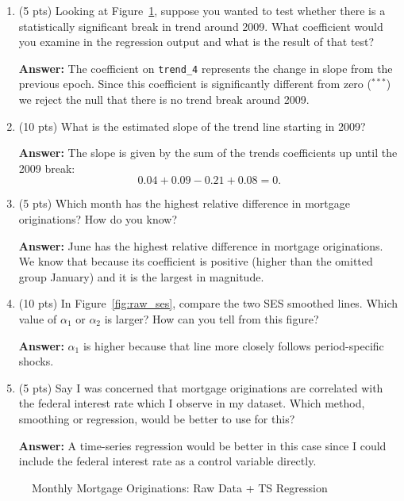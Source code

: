 \documentclass[12pt]{article}
\newcommand{\answer}[1]{{\color{blue_winged_teal}\textbf{Answer:} #1}}
\newcommand{\pts}[1]{{\color{zinc500}(#1 pts)}}
\begin{document}
\begin{enumerate}
    \begin{enumerate}
      \item \pts{5} Looking at Figure~\ref{fig:raw_ts}, suppose you wanted to test whether there is a statistically significant break in trend around 2009.
        What coefficient would you examine in the regression output and what is the result of that test? 

      \answer{
        The coefficient on \texttt{trend\_4} represents the change in slope from the previous epoch. 
        Since this coefficient is significantly different from zero ($^{***}$) we reject the null that there is no trend break around 2009. 
      }
        
      \item \pts{10} What is the estimated slope of the trend line starting in 2009?

      \answer{
        The slope is given by the sum of the trends coefficients up until the 2009 break:
        $$
          0.04 + 0.09 - 0.21 + 0.08 = 0.
        $$
      }

      \item \pts{5} Which month has the highest relative difference in mortgage originations? How do you know?

      \answer{June has the highest relative difference in mortgage originations. We know that because its coefficient is positive (higher than the omitted group January) and it is the largest in magnitude.}

      \item \pts{10} In Figure~\ref{fig:raw_ses}, compare the two SES smoothed lines. Which value of $\alpha_1$ or $\alpha_2$ is larger?
        How can you tell from this figure?

        \answer{$\alpha_1$ is higher because that line more closely follows period-specific shocks.}

      \item \pts{5} Say I was concerned that mortgage originations are correlated with the federal interest rate which I observe in my dataset. Which method, smoothing or regression, would be better to use for this?

      \answer{A time-series regression would be better in this case since I could include the federal interest rate as a control variable directly.}
    \end{enumerate}

    \newpage

    \begin{figure}[h!]
      \caption{Monthly Mortgage Originations: Raw Data + TS Regression}
      \label{fig:raw_ts}


\end{figure}
\end{enumerate}
\end{document}
